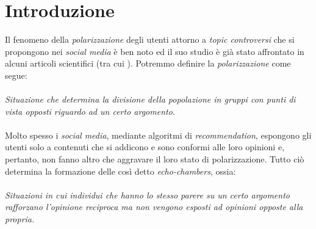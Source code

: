 \chapter{Introduzione}
\label{chap:introduzione}

Il fenomeno della \textit{polarizzazione} degli utenti attorno a \textit{topic controversi} che si propongono nei \textit{social media} è ben noto ed il suo studio è già stato affrontato in alcuni articoli scientifici (tra cui \cite{musco:paper}\cite{morales:paper}). Potremmo definire la \textit{polarizzazione} come segue:
\\\\
\textit{Situazione che determina la divisione della popolazione in gruppi con punti di vista opposti riguardo ad un certo argomento.}
\\\\Molto spesso i \textit{social media}, mediante algoritmi di \textit{recommendation}, espongono gli utenti solo a contenuti che si addicono e sono conformi alle loro opinioni e, pertanto, non fanno altro che aggravare il loro stato di polarizzazione. Tutto ciò determina la formazione delle così detto \textit{echo-chambers}, ossia:
\\\\
\textit{Situazioni in cui individui che hanno lo stesso parere su un certo argomento rafforzano l'opinione reciproca ma non vengono esposti ad opinioni opposte alla propria.}
\\\\
